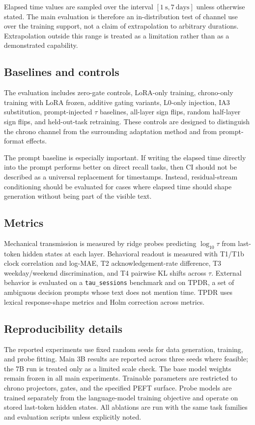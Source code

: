 \documentclass[conference,10pt]{IEEEtran}
\newcommand{\CI}{\textsc{CI}}
\newcommand{\Tau}{\tau}
\begin{document}
Elapsed time values are sampled over the interval $[1\ \mathrm{s},7\ \mathrm{days}]$ unless otherwise stated. The main evaluation is therefore an in-distribution test of channel use over the training support, not a claim of extrapolation to arbitrary durations. Extrapolation outside this range is treated as a limitation rather than as a demonstrated capability.

\subsection{Baselines and controls}

The evaluation includes zero-gate controls, LoRA-only training, chrono-only training with LoRA frozen, additive gating variants, L0-only injection, IA3 substitution, prompt-injected $\Tau$ baselines, all-layer sign flips, random half-layer sign flips, and held-out-task retraining. These controls are designed to distinguish the chrono channel from the surrounding adaptation method and from prompt-format effects.

The prompt baseline is especially important. If writing the elapsed time directly into the prompt performs better on direct recall tasks, then \CI{} should not be described as a universal replacement for timestamps. Instead, residual-stream conditioning should be evaluated for cases where elapsed time should shape generation without being part of the visible text.

\subsection{Metrics}

Mechanical transmission is measured by ridge probes predicting $\log_{10}\Tau$ from last-token hidden states at each layer. Behavioral readout is measured with T1/T1b clock correlation and log-MAE, T2 acknowledgement-rate difference, T3 weekday/weekend discrimination, and T4 pairwise KL shifts across $\Tau$. External behavior is evaluated on a \texttt{tau\_sessions} benchmark and on TPDR, a set of ambiguous decision prompts whose text does not mention time. TPDR uses lexical response-shape metrics and Holm correction across metrics.

\subsection{Reproducibility details}

The reported experiments use fixed random seeds for data generation, training, and probe fitting. Main 3B results are reported across three seeds where feasible; the 7B run is treated only as a limited scale check. The base model weights remain frozen in all main experiments. Trainable parameters are restricted to chrono projectors, gates, and the specified PEFT surface. Probe models are trained separately from the language-model training objective and operate on stored last-token hidden states. All ablations are run with the same task families and evaluation scripts unless explicitly noted.
\end{document}
